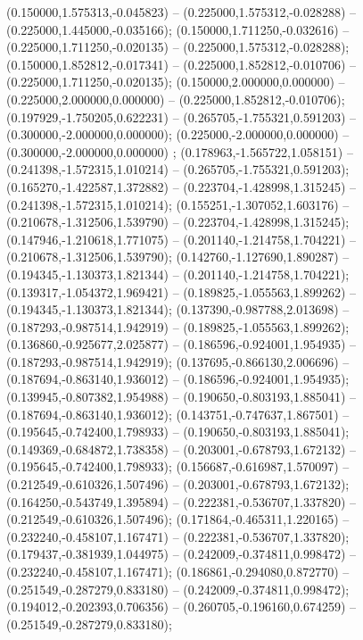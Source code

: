 (0.150000,1.575313,-0.045823) -- (0.225000,1.575312,-0.028288) -- (0.225000,1.445000,-0.035166);
 (0.150000,1.711250,-0.032616) -- (0.225000,1.711250,-0.020135) -- (0.225000,1.575312,-0.028288);
 (0.150000,1.852812,-0.017341) -- (0.225000,1.852812,-0.010706) -- (0.225000,1.711250,-0.020135);
 (0.150000,2.000000,0.000000) -- (0.225000,2.000000,0.000000) -- (0.225000,1.852812,-0.010706);
 (0.197929,-1.750205,0.622231) -- (0.265705,-1.755321,0.591203) -- (0.300000,-2.000000,0.000000);
 (0.225000,-2.000000,0.000000) -- (0.300000,-2.000000,0.000000) ;
 (0.178963,-1.565722,1.058151) -- (0.241398,-1.572315,1.010214) -- (0.265705,-1.755321,0.591203);
 (0.165270,-1.422587,1.372882) -- (0.223704,-1.428998,1.315245) -- (0.241398,-1.572315,1.010214);
 (0.155251,-1.307052,1.603176) -- (0.210678,-1.312506,1.539790) -- (0.223704,-1.428998,1.315245);
 (0.147946,-1.210618,1.771075) -- (0.201140,-1.214758,1.704221) -- (0.210678,-1.312506,1.539790);
 (0.142760,-1.127690,1.890287) -- (0.194345,-1.130373,1.821344) -- (0.201140,-1.214758,1.704221);
 (0.139317,-1.054372,1.969421) -- (0.189825,-1.055563,1.899262) -- (0.194345,-1.130373,1.821344);
 (0.137390,-0.987788,2.013698) -- (0.187293,-0.987514,1.942919) -- (0.189825,-1.055563,1.899262);
 (0.136860,-0.925677,2.025877) -- (0.186596,-0.924001,1.954935) -- (0.187293,-0.987514,1.942919);
 (0.137695,-0.866130,2.006696) -- (0.187694,-0.863140,1.936012) -- (0.186596,-0.924001,1.954935);
 (0.139945,-0.807382,1.954988) -- (0.190650,-0.803193,1.885041) -- (0.187694,-0.863140,1.936012);
 (0.143751,-0.747637,1.867501) -- (0.195645,-0.742400,1.798933) -- (0.190650,-0.803193,1.885041);
 (0.149369,-0.684872,1.738358) -- (0.203001,-0.678793,1.672132) -- (0.195645,-0.742400,1.798933);
 (0.156687,-0.616987,1.570097) -- (0.212549,-0.610326,1.507496) -- (0.203001,-0.678793,1.672132);
 (0.164250,-0.543749,1.395894) -- (0.222381,-0.536707,1.337820) -- (0.212549,-0.610326,1.507496);
 (0.171864,-0.465311,1.220165) -- (0.232240,-0.458107,1.167471) -- (0.222381,-0.536707,1.337820);
 (0.179437,-0.381939,1.044975) -- (0.242009,-0.374811,0.998472) -- (0.232240,-0.458107,1.167471);
 (0.186861,-0.294080,0.872770) -- (0.251549,-0.287279,0.833180) -- (0.242009,-0.374811,0.998472);
 (0.194012,-0.202393,0.706356) -- (0.260705,-0.196160,0.674259) -- (0.251549,-0.287279,0.833180);
